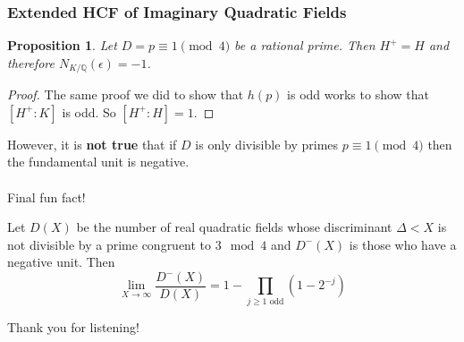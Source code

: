 \documentclass{beamer}
\newcommand{\QQ}{\mathbb{Q}}
\theoremstyle{plain}
\newtheorem{proposition}[thm]{Proposition}
\begin{document}
\begin{frame}
    \frametitle{Extended HCF of Imaginary Quadratic Fields}
    \begin{proposition}
        Let $D=p\equiv1\pmod{4}$ be a rational prime. Then $H^+=H$ and therefore $N_{K/\QQ}(\epsilon)=-1$.
    \end{proposition}
    \pause
    \begin{proof}
        The same proof we did to show that $h(p)$ is odd works to show that $[H^+:K]$ is odd. So $[H^+:H]=1$.
    \end{proof}

\end{frame}

\begin{frame}
    However, it is \textbf{not true} that if $D$ is only divisible by primes $p\equiv1\pmod{4}$ then the fundamental unit is negative. 
    \pause
    \\~\\
    Final fun fact!
    \pause
    \begin{theorem}[Maybe]
        Let $D(X)$ be the number of real quadratic fields whose discriminant $\Delta<X$ is not divisible by a prime congruent to $3\mod{4}$ and $D^-(X)$ is those who have a negative unit. Then 
        $$\lim_{X\to\infty}\frac{D^-(X)}{D(X)}=1-\prod_{j\geq1\text{ odd}}(1-2^{-j})$$
    \end{theorem}
\end{frame}

\begin{frame}
    Thank you for listening!
\end{frame}
\end{document}
